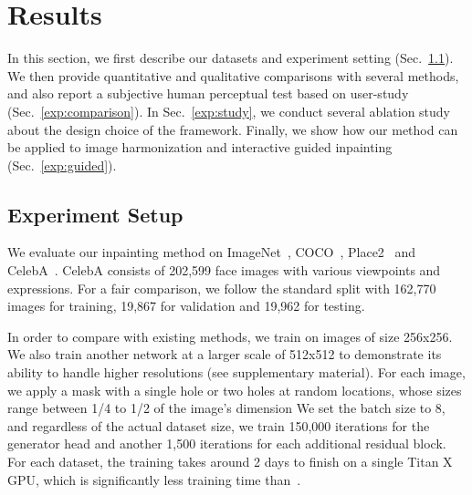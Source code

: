 \section{Results}
\label{sec:results}
In this section, we first describe our datasets and experiment setting (Sec.~\ref{exp:setup}). We then provide quantitative and qualitative comparisons with several methods, and also report a subjective human perceptual test based on user-study (Sec.~\ref{exp:comparison}). In Sec.~\ref{exp:study}, we conduct several ablation study about the design choice of the framework. Finally, we show how our method can be applied to image harmonization and interactive guided inpainting (Sec.~\ref{exp:guided}).

\subsection{Experiment Setup}
\label{exp:setup}
We evaluate our inpainting method on ImageNet~\cite{russakovsky2015imagenet}, COCO~\cite{lin2014microsoft}, Place2~\cite{zhou2016places} and CelebA~\cite{liu2015faceattributes}. CelebA consists of 202,599 face images with various viewpoints and expressions. For a fair comparison, we follow the standard split with 162,770 images for training, 19,867 for validation and 19,962 for testing.

In order to compare with existing methods, we train on images of size 256x256. We also train another network at a larger scale of 512x512 to demonstrate its ability to handle higher resolutions (see supplementary material). For each image, we apply a mask with a single hole or two holes at random locations, whose sizes range between 1/4 to 1/2 of the image's dimension
We set the batch size to 8, and regardless of the actual dataset size, we train 150,000 iterations for the generator head and another 1,500 iterations for each additional residual block. For each dataset, the training takes around 2 days to finish on a single Titan X GPU, which is significantly less training time than~\cite{iizuka2017globally}.

